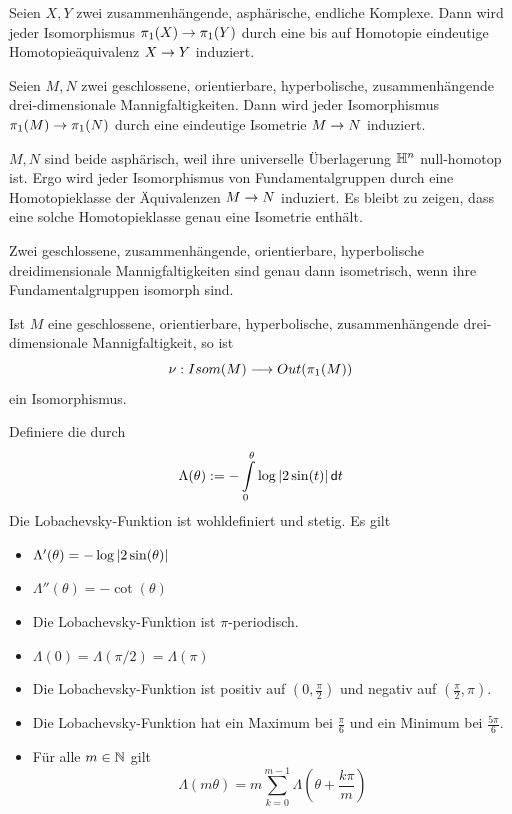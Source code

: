 \documentclass{book}
\renewcommand{\d}{\textsf{d}}
\begin{document}
\Satz{}
Seien $X,Y$ zwei zusammenhängende, asphärische, endliche Komplexe. Dann wird jeder Isomorphismus $\pi_1(X) \overset{}{\rightarrow} \pi_1(Y)$ durch eine bis auf Homotopie eindeutige Homotopieäquivalenz $X\overset{}{\rightarrow} Y$ induziert.

\label{MostomTheorem}
Seien $M,N$ zwei geschlossene, orientierbare, hyperbolische, zusammenhängende drei-dimensionale Mannigfaltigkeiten. Dann wird jeder Isomorphismus $\pi_1(M) \overset{}{\rightarrow} \pi_1(N)$ durch eine eindeutige Isometrie $M\overset{}{\rightarrow} N$ induziert.
\begin{Beweis}{}
	$M,N$ sind beide asphärisch, weil ihre universelle Überlagerung $\mathbb{H}^n$ null-homotop ist. Ergo wird jeder Isomorphismus von Fundamentalgruppen durch eine Homotopieklasse der Äquivalenzen $M\overset{}{\rightarrow} N$ induziert. Es bleibt zu zeigen, dass eine solche Homotopieklasse genau eine Isometrie enthält.
\end{Beweis}

\Kor{}
Zwei geschlossene, zusammenhängende, orientierbare, hyperbolische dreidimensionale Mannigfaltigkeiten sind genau dann isometrisch, wenn ihre Fundamentalgruppen isomorph sind.

\Kor{}
Ist $M$ eine geschlossene, orientierbare, hyperbolische, zusammenhängende drei-dimensionale Mannigfaltigkeit, so ist
\[ \nu : Isom(M) \overset{}{\longrightarrow} Out(\pi_1(M)) \]
ein Isomorphismus.

\Def{}
Definiere die  durch
\[ \Lambda(\theta) :=- \int\limits_{0}^{\theta} \log \bet{2\sin (t)} \d t \]
\Lem{}
Die Lobachevsky-Funktion ist wohldefiniert und stetig. Es gilt
\begin{itemize}
	\item $\Lambda'(\theta) = -\log \left|2\sin (\theta)\right| $
	\item $\Lambda''(\theta) = -\cot(\theta) $
\end{itemize}

\Lem{}
\begin{itemize}
	\item Die Lobachevsky-Funktion ist $\pi$-periodisch.
	\item $\Lambda(0) = \Lambda(\pi / 2) = \Lambda(\pi)$
	\item Die Lobachevsky-Funktion ist positiv auf $(0,\frac{\pi}{2})$ und negativ auf $(\frac{\pi}{2}, \pi)$.
	\item Die Lobachevsky-Funktion hat ein Maximum bei $\frac{\pi}{6}$ und ein Minimum bei $\frac{5\pi}{6}$.
	\item Für alle $m\in \mathbb{N}$ gilt
	\[ \Lambda(m\theta) = m\sum\limits_{k = 0}^{m-1} \Lambda(\theta + \frac{k\pi}{m}) \]
\end{itemize}
\end{document}
